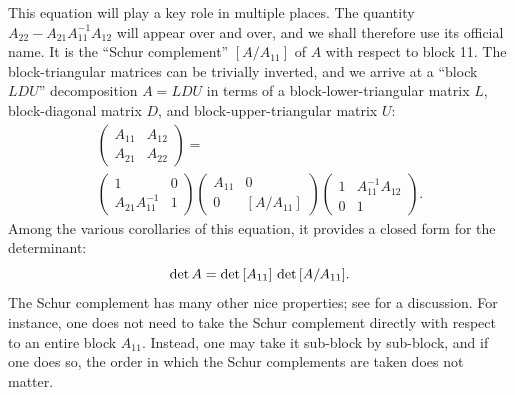 \documentclass{SciPost}
\begin{document}
This equation will play a key role in multiple places. The quantity
$A_{22} - A_{21}A_{11}^{-1} A_{12}$ will appear over and over, and
we shall therefore use its official name. It is the ``Schur complement''
$[A / A_{11}]$ of $A$ with respect to block 11. The block-triangular matrices can be trivially inverted, and we arrive at a ``block $LDU$'' decomposition $A=LDU$ in terms of a block-lower-triangular matrix $L$, block-diagonal matrix $D$, and block-upper-triangular matrix $U$:
\begin{eqnarray}
\label{eq:lu2-repeat}
\begin{pmatrix}
A_{11} & A_{12} \\
A_{21} & A_{22}
\end{pmatrix} =
\nonumber \\
\begin{pmatrix}
1 & 0 \\
A_{21} A_{11}^{-1} & 1
\end{pmatrix}
\begin{pmatrix}
A_{11} & 0 \\
0 & [A / A_{11}]
\end{pmatrix}
\begin{pmatrix}
1 & A_{11}^{-1} A_{12} \\
0 & 1
\end{pmatrix}.
\end{eqnarray}
Among the various corollaries of this equation, it provides a closed form for the
determinant:
\begin{equation}
\label{eq:Schur}
{\rm det}\, A =  {\rm det}\,  [A_{11}]  \ {\rm det}\, [A / A_{11}].
\end{equation}
The Schur complement has many other nice properties; see \cite{nunez2025} for a discussion.
For instance, one does not need to take the Schur complement directly with respect to an entire block $A_{11}$. Instead, one may take it sub-block by sub-block, and if one does so, the order in which the Schur complements are taken does not matter.
\end{document}
